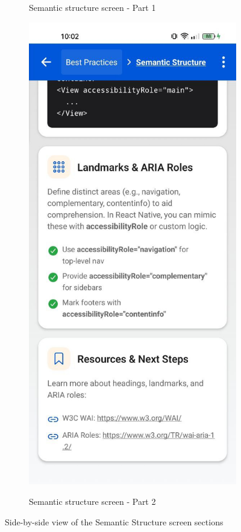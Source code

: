 \begin{figure}[ht]
\begin{subfigure}[b]{0.48\textwidth}
        \caption{Semantic structure screen - Part 1}
        \label{fig:semantics-left}
    \end{subfigure}
    \hfill
    \begin{subfigure}[b]{0.48\textwidth}
        \centering
        \includegraphics[width=\linewidth, alt={Second part of the Semantic structure screen}]{img/semantics2.jpg}
        \caption{Semantic structure screen - Part 2}
        \label{fig:semantics-right}
    \end{subfigure}
    \caption{Side-by-side view of the Semantic Structure screen sections}
    \label{fig:semantics_screens_sidebyside}
\end{figure}

